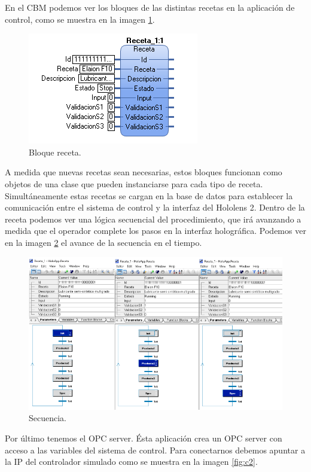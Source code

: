 En el CBM podemos ver los bloques de las distintas recetas en la aplicación de control, como se muestra en la imagen \ref{fig:c7}.

\begin{figure}[htpb]
	\centering
	\includegraphics[scale=.6]{./Figures/c7.png}
	\caption{Bloque receta\protect\footnotemark.}
	\label{fig:c7}
\end{figure}

A medida que nuevas recetas sean necesarias, estos bloques funcionan como objetos de una clase que pueden instanciarse para cada tipo de receta. Simultáneamente estas recetas se cargan en la base de datos para establecer la comunicación entre el sistema de control y la interfaz del Hololens 2. Dentro de la receta podemos ver una lógica secuencial del procedimiento, que irá avanzando a medida que el operador complete los pasos en la interfaz holográfica. Podemos ver en la imagen \ref{fig:c123} el avance de la secuencia en el tiempo.

\begin{figure}[htpb]
	\centering
	\includegraphics[scale=.5]{./Figures/c123.png}
	\caption{Secuencia\protect\footnotemark.}
	\label{fig:c123}
\end{figure}

Por último tenemos el OPC server. Ésta aplicación crea un OPC server con acceso a las variables del sistema de control. Para conectarnos debemos apuntar a la IP del controlador simulado como se muestra en la imagen \ref{fig:c2}.

